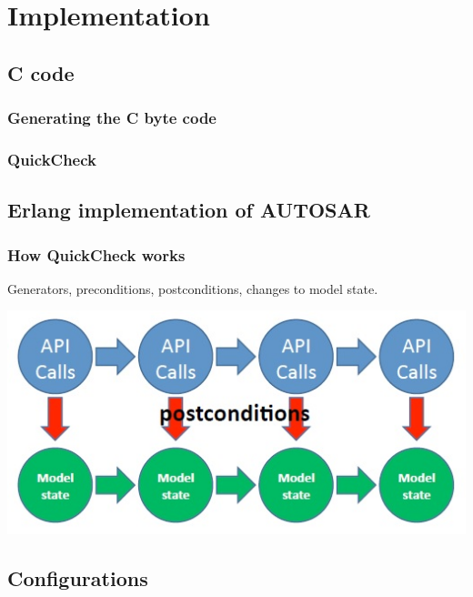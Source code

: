 \documentclass{beamer}
\begin{document}
\section{Implementation}

\subsection{C code}
\begin{frame}
  \frametitle{Generating the C byte code}
  
\end{frame}

\begin{frame}
  \frametitle{QuickCheck}
  
\end{frame}

\subsection{Erlang implementation of AUTOSAR}


\begin{frame}
  \frametitle{How QuickCheck works}
  Generators, preconditions, postconditions, changes to model state.

  \includegraphics[keepaspectratio, width=0.7\linewidth]{api_calls}
\end{frame}

\subsection{Configurations}
\end{document}
